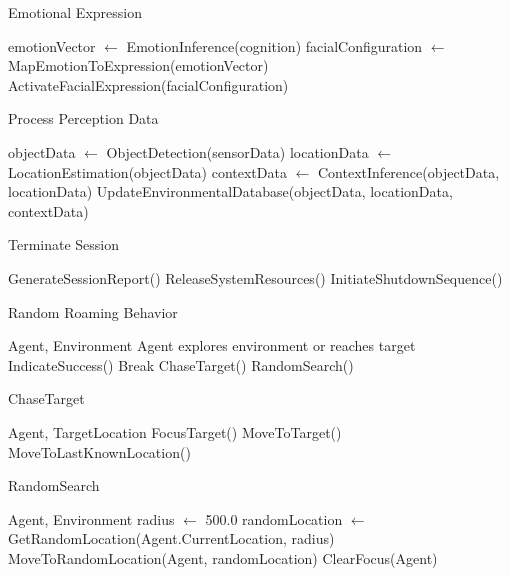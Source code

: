 \documentclass[pdflatex,sn-mathphys-num]{sn-jnl}%
\theoremstyle{thmstyleone}%
\theoremstyle{thmstyletwo}%
\theoremstyle{thmstylethree}%
\begin{document}
\begin{algorithm}
\caption{Emotional Expression}\label{algo_emotional_expression}
\begin{algorithmic}[1]
    \State emotionVector $\gets$ EmotionInference(cognition)
    \State facialConfiguration $\gets$ MapEmotionToExpression(emotionVector)
    \State ActivateFacialExpression(facialConfiguration)
\EndProcedure
\end{algorithmic}
\end{algorithm}


\begin{algorithm}
\caption{Process Perception Data}\label{algo_process_perception_data}
\begin{algorithmic}[1]
    \State objectData $\gets$ ObjectDetection(sensorData)
    \State locationData $\gets$ LocationEstimation(objectData)
    \State contextData $\gets$ ContextInference(objectData, locationData)
    \State UpdateEnvironmentalDatabase(objectData, locationData, contextData)
\EndProcedure
\end{algorithmic}
\end{algorithm}


\begin{algorithm}
\caption{Terminate Session}\label{algo_terminate_session}
\begin{algorithmic}[1]
    \State GenerateSessionReport()
    \State ReleaseSystemResources()
    \State InitiateShutdownSequence()
\EndProcedure
\end{algorithmic}
\end{algorithm}




\begin{algorithm}
\caption{Random Roaming Behavior}\label{algo:random_roaming}
\begin{algorithmic}[1]
\Require Agent, Environment
\Ensure Agent explores environment or reaches target
\State IndicateSuccess()
\State Break
\EndIf
{}
\State ChaseTarget()
\Else
\State RandomSearch()
\EndIf
\EndWhile
\end{algorithmic}
\end{algorithm}
\begin{algorithm}
\caption{ChaseTarget}\label{algo:chase_target}
\begin{algorithmic}[1]
\Require Agent, TargetLocation
\State FocusTarget()
\State MoveToTarget()
\Else
\State MoveToLastKnownLocation()
\EndIf
\end{algorithmic}
\end{algorithm}
\begin{algorithm}
\caption{RandomSearch}\label{algo:random_search}
\begin{algorithmic}[1]
\Require Agent, Environment
\State radius $\leftarrow$ 500.0
\State randomLocation $\leftarrow$ GetRandomLocation(Agent.CurrentLocation, radius)
\State MoveToRandomLocation(Agent, randomLocation)
\State ClearFocus(Agent)
\end{algorithmic}
\end{algorithm}
\end{document}
